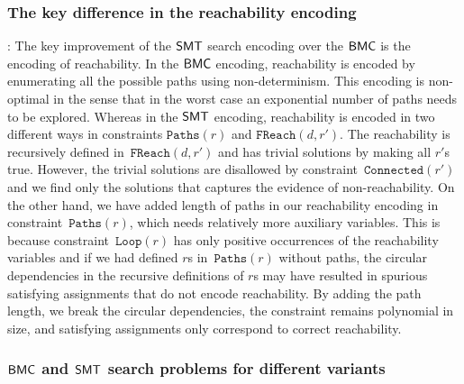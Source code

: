 
\subsubsection{The key difference in the reachability encoding}:
The key improvement of the $\mathsf{SMT}$ search encoding over the $\mathsf{BMC}$ is the
encoding of reachability.
%
In the $\mathsf{BMC}$ encoding, reachability is encoded by enumerating all the possible paths using non-determinism.
%
This encoding is non-optimal in the sense that in the worst case an exponential number of paths needs to be explored.
%
Whereas in the $\mathsf{SMT}$ encoding, reachability is encoded in two different
ways in constraints $\texttt{Paths}(r)$ and $\texttt{FReach}(d,r')$.
%
The reachability is recursively defined in~$\texttt{FReach}(d,r')$ and has
trivial solutions by making all $r'$s true.
%
However, the trivial solutions are disallowed by constraint~$\texttt{Connected}(r')$ and we find
only the solutions that captures the evidence of non-reachability.
%
On the other hand, we have added length of paths in our reachability encoding in constraint~$\texttt{Paths}(r)$, which needs relatively more auxiliary variables.
%
This is because constraint~$\texttt{Loop}(r)$ has only positive
occurrences of the reachability variables and if we had defined
$r$s in~$\texttt{Paths}(r)$ without paths,
the circular dependencies in the recursive definitions of $r$s
may have resulted in spurious satisfying assignments that
do not encode reachability.
%
By adding the path length, we break the circular dependencies, the
constraint remains polynomial in size, and satisfying assignments only
correspond to correct reachability.



\subsubsection{$\mathsf{BMC}$ and $\mathsf{SMT}$ search problems for different variants}


